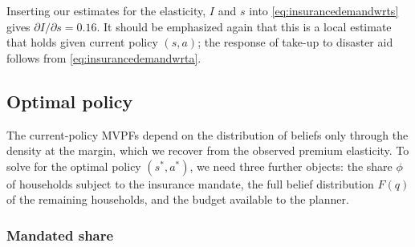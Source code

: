 \documentclass[12pt]{article}
\begin{document}
Inserting our estimates for the elasticity, $I$ and $s$ into \eqref{eq:insurancedemandwrts} gives $\partial I/\partial s=0.16$. It should be emphasized again that this is a local estimate that holds given current policy $(s,a)$; the response of take-up to disaster aid follows from \eqref{eq:insurancedemandwrta}.

\subsection{Optimal policy}\label{subsec:calib_optimal}

The current-policy MVPFs depend on the distribution of beliefs only through the density at the margin, which we recover from the observed premium elasticity. To solve for the optimal policy $(s^*,a^*)$, we need three further objects: the share $\phi$ of households subject to the insurance mandate, the full belief distribution $F(q)$ of the remaining households, and the budget available to the planner.

\subsubsection{Mandated share}\label{subsec:calib_phi}
\end{document}
